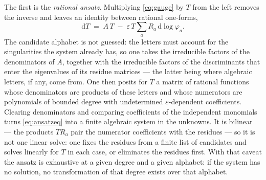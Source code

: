 \documentclass[11pt]{article}
\newcommand{\eps}{\varepsilon}
\newcommand{\dd}{\mathrm{d}}
\begin{document}
The first is the \emph{rational ansatz}.  Multiplying
\eqref{eq:gauge} by $T$ from the left removes the inverse and leaves
an identity between rational one-forms,
\begin{equation}
  \dd T \;=\; A\,T \;-\; \eps\, T \sum_a R_a\,\dd\log\varphi_a .
  \label{eq:ansatzeq}
\end{equation}
The candidate alphabet is not guessed: the letters must account for
the singularities the system already has, so one takes the
irreducible factors of the denominators of $A$, together with the
irreducible factors of the discriminants that enter the eigenvalues
of its residue matrices --- the latter being where algebraic letters,
if any, come from.  One then posits for $T$ a matrix of rational
functions whose denominators are products of these letters and whose
numerators are polynomials of bounded degree with undetermined
$\eps$-dependent coefficients.  Clearing denominators and comparing
coefficients of the independent monomials turns \eqref{eq:ansatzeq}
into a finite algebraic system in the unknowns.  It is bilinear ---
the products $T R_a$ pair the numerator coefficients with the
residues --- so it is not one linear solve: one fixes the residues
from a finite list of candidates and solves linearly for $T$ in each
case, or eliminates the residues first.  With that caveat the ansatz
is exhaustive at a given degree and a given alphabet: if the system
has no solution, no transformation of that degree exists over that
alphabet.
\end{document}
